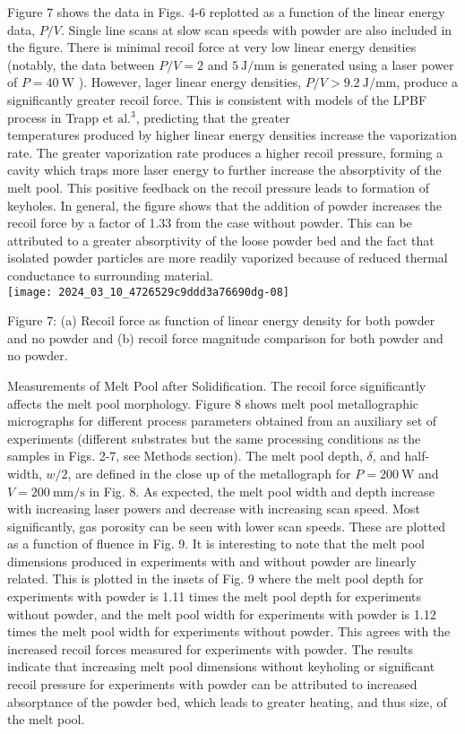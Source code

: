 \documentclass[10pt]{article}
\begin{document}
Figure 7 shows the data in Figs. 4-6 replotted as a function of the linear energy data, $P / V$. Single line scans at slow scan speeds with powder are also included in the figure. There is minimal recoil force at very low linear energy densities (notably, the data between $P / V=2$ and $5 \mathrm{~J} / \mathrm{mm}$ is generated using a laser power of $P=40 \mathrm{~W}$ ). However, lager linear energy densities, $P / V>9.2 \mathrm{~J} / \mathrm{mm}$, produce a significantly greater recoil force. This is consistent with models of the LPBF process in Trapp et $\mathrm{al} .^{3}$, predicting that the greater\\
temperatures produced by higher linear energy densities increase the vaporization rate. The greater vaporization rate produces a higher recoil pressure, forming a cavity which traps more laser energy to further increase the absorptivity of the melt pool. This positive feedback on the recoil pressure leads to formation of keyholes. In general, the figure shows that the addition of powder increases the recoil force by a factor of 1.33 from the case without powder. This can be attributed to a greater absorptivity of the loose powder bed and the fact that isolated powder particles are more readily vaporized because of reduced thermal conductance to surrounding material.\\
\texttt{[image: 2024\_03\_10\_4726529c9ddd3a76690dg-08]}

Figure 7: (a) Recoil force as function of linear energy density for both powder and no powder and (b) recoil force magnitude comparison for both powder and no powder.

Measurements of Melt Pool after Solidification. The recoil force significantly affects the melt pool morphology. Figure 8 shows melt pool metallographic micrographs for different process parameters obtained from an auxiliary set of experiments (different substrates but the same processing conditions as the samples in Figs. 2-7, see Methods section). The melt pool depth, $\delta$, and half-width, $w / 2$, are defined in the close up of the metallograph for $P=200 \mathrm{~W}$ and $V=200 \mathrm{~mm} / \mathrm{s}$ in Fig. 8. As expected, the melt pool width and depth increase with increasing laser powers and decrease with increasing scan speed. Most significantly, gas porosity can be seen with lower scan speeds. These are plotted as a function of fluence in Fig. 9. It is interesting to note that the melt pool dimensions produced in experiments with and without powder are linearly related. This is plotted in the insets of Fig. 9 where the melt pool depth for experiments with powder is 1.11 times the melt pool depth for experiments without powder, and the melt pool width for experiments with powder is 1.12 times the melt pool width for experiments without powder. This agrees with the increased recoil forces measured for experiments with powder. The results indicate that increasing melt pool dimensions without keyholing or significant recoil pressure for experiments with powder can be attributed to increased absorptance of the powder bed, which leads to greater heating, and thus size, of the melt pool.
\end{document}
